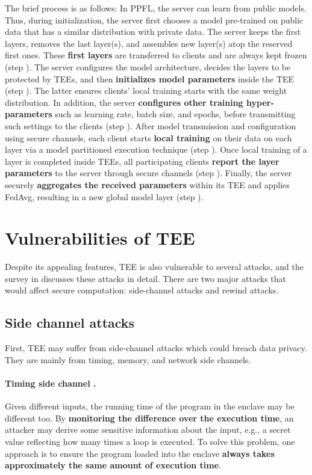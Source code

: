\documentclass[lang=en]{sjtuarticle}
\begin{document}
The brief process is as follows: In PPFL, the server can learn from public models. Thus, during
initialization, the server first chooses a model pre-trained on public
data that has a similar distribution with private data. The server
keeps the first layers, removes the last layer(s), and assembles new
layer(s) atop the reserved first ones. These \textbf{first layers} are transferred
to clients and are always kept frozen (step ). The server configures
the model architecture, decides the layers to be protected by TEEs,
and then \textbf{initializes model parameters} inside the TEE (step ). The latter ensures clients' local training starts with the same weight
distribution. In addition, the server \textbf{configures other training
hyper-parameters} such as learning rate, batch size, and epochs,
before transmitting such settings to the clients (step ). After model transmission and configuration using
secure channels, each client starts \textbf{local training} on their data on
each layer via a model partitioned execution technique (step ). Once local training of a layer is
completed inside TEEs, all participating clients \textbf{report the layer
parameters} to the server through secure channels (step ).
Finally, the server securely \textbf{aggregates the received parameters}
within its TEE and applies FedAvg, resulting in a new global
model layer (step ).

\section{Vulnerabilities of TEE}

Despite its appealing features, TEE is also vulnerable to several attacks, and
the survey in \cite{fei2021security} discusses these attacks in detail. There are two major attacks
that would affect secure computation: side-channel attacks and rewind attacks.

\subsection{Side channel attacks}

First, TEE may suffer from side-channel attacks which could
breach data privacy. They are mainly from timing, memory, and network side channels.

\paragraph{Timing side channel \cite{gupta2016using}.} Given different inputs, the running time of the program in the
enclave may be different too. By \textbf{monitoring the difference over the execution time}, an
attacker may derive some sensitive information about the input, e.g., a secret value reflecting
how many times a loop is executed. To solve this problem, one approach is to ensure the
program loaded into the enclave \textbf{always takes approximately the same amount of execution
time}.
\end{document}
